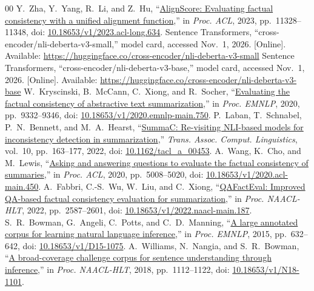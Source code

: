 \documentclass[conference,a4paper]{IEEEtran}
\begin{document}
\begin{thebibliography}{00}
 Y.~Zha, Y.~Yang, R.~Li, and Z.~Hu, ``\href{https://aclanthology.org/2023.acl-long.634/}{AlignScore: Evaluating factual consistency with a unified alignment function},'' in \emph{Proc. ACL}, 2023, pp.~11328--11348, doi: \href{https://doi.org/10.18653/v1/2023.acl-long.634}{10.18653/v1/2023.acl-long.634}.
 Sentence Transformers, ``cross-encoder/nli-deberta-v3-small,'' model card, accessed Nov.~1, 2026. [Online]. Available: \url{https://huggingface.co/cross-encoder/nli-deberta-v3-small}
 Sentence Transformers, ``cross-encoder/nli-deberta-v3-base,'' model card, accessed Nov.~1, 2026. [Online]. Available: \url{https://huggingface.co/cross-encoder/nli-deberta-v3-base}
 W.~Kryscinski, B.~McCann, C.~Xiong, and R.~Socher, ``\href{https://aclanthology.org/2020.emnlp-main.750/}{Evaluating the factual consistency of abstractive text summarization},'' in \emph{Proc. EMNLP}, 2020, pp.~9332--9346, doi: \href{https://doi.org/10.18653/v1/2020.emnlp-main.750}{10.18653/v1/2020.emnlp-main.750}.
 P.~Laban, T.~Schnabel, P.~N.~Bennett, and M.~A.~Hearst, ``\href{https://aclanthology.org/2022.tacl-1.10/}{SummaC: Re-visiting NLI-based models for inconsistency detection in summarization},'' \emph{Trans. Assoc. Comput. Linguistics}, vol.~10, pp.~163--177, 2022, doi: \href{https://doi.org/10.1162/tacl_a_00453}{10.1162/tacl\_a\_00453}.
 A.~Wang, K.~Cho, and M.~Lewis, ``\href{https://aclanthology.org/2020.acl-main.450/}{Asking and answering questions to evaluate the factual consistency of summaries},'' in \emph{Proc. ACL}, 2020, pp.~5008--5020, doi: \href{https://doi.org/10.18653/v1/2020.acl-main.450}{10.18653/v1/2020.acl-main.450}.
 A.~Fabbri, C.-S.~Wu, W.~Liu, and C.~Xiong, ``\href{https://aclanthology.org/2022.naacl-main.187/}{QAFactEval: Improved QA-based factual consistency evaluation for summarization},'' in \emph{Proc. NAACL-HLT}, 2022, pp.~2587--2601, doi: \href{https://doi.org/10.18653/v1/2022.naacl-main.187}{10.18653/v1/2022.naacl-main.187}.
 S.~R.~Bowman, G.~Angeli, C.~Potts, and C.~D.~Manning, ``\href{https://aclanthology.org/D15-1075/}{A large annotated corpus for learning natural language inference},'' in \emph{Proc. EMNLP}, 2015, pp.~632--642, doi: \href{https://doi.org/10.18653/v1/D15-1075}{10.18653/v1/D15-1075}.
 A.~Williams, N.~Nangia, and S.~R.~Bowman, ``\href{https://aclanthology.org/N18-1101/}{A broad-coverage challenge corpus for sentence understanding through inference},'' in \emph{Proc. NAACL-HLT}, 2018, pp.~1112--1122, doi: \href{https://doi.org/10.18653/v1/N18-1101}{10.18653/v1/N18-1101}.

\end{thebibliography}
\end{document}
